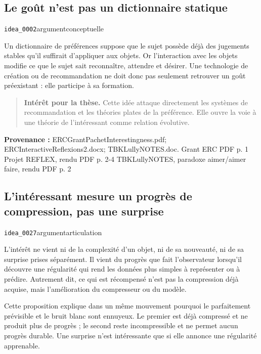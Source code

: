 \documentclass[10pt,a4paper]{article}
\begin{document}
\subsection{Le goût n'est pas un dictionnaire statique}
{\small\color{metadata} \texttt{idea\_0002}\quad\textbullet\quad argument\quad\textbullet\quad conceptuelle\par}

Un dictionnaire de préférences suppose que le sujet possède déjà des jugements stables qu'il suffirait d'appliquer aux objets. Or l'interaction avec les objets modifie ce que le sujet sait reconnaître, attendre et désirer. Une technologie de création ou de recommandation ne doit donc pas seulement retrouver un goût préexistant : elle participe à sa formation.

\begin{quote}
\textbf{Intérêt pour la thèse.} Cette idée attaque directement les systèmes de recommandation et les théories plates de la préférence. Elle ouvre la voie à une théorie de l'intéressant comme relation évolutive.
\end{quote}
{\footnotesize\color{metadata}\textbf{Provenance :} ERCGrantPachetInterestingness.pdf; ERCInteractiveReflexions2.docx; TBKLullyNOTES.doc. Grant ERC PDF p. 1 Projet REFLEX, rendu PDF p. 2-4 TBKLullyNOTES, paradoxe aimer/aimer faire, rendu PDF p. 2\par}

\subsection{L'intéressant mesure un progrès de compression, pas une surprise}
{\small\color{metadata} \texttt{idea\_0027}\quad\textbullet\quad argument\quad\textbullet\quad articulation\par}

L'intérêt ne vient ni de la complexité d'un objet, ni de sa nouveauté, ni de sa surprise prises séparément. Il vient du progrès que fait l'observateur lorsqu'il découvre une régularité qui rend les données plus simples à représenter ou à prédire. Autrement dit, ce qui est récompensé n'est pas la compression déjà acquise, mais l'amélioration du compresseur ou du modèle.

Cette proposition explique dans un même mouvement pourquoi le parfaitement prévisible et le bruit blanc sont ennuyeux. Le premier est déjà compressé et ne produit plus de progrès ; le second reste incompressible et ne permet aucun progrès durable. Une surprise n'est intéressante que si elle annonce une régularité apprenable.
\end{document}
